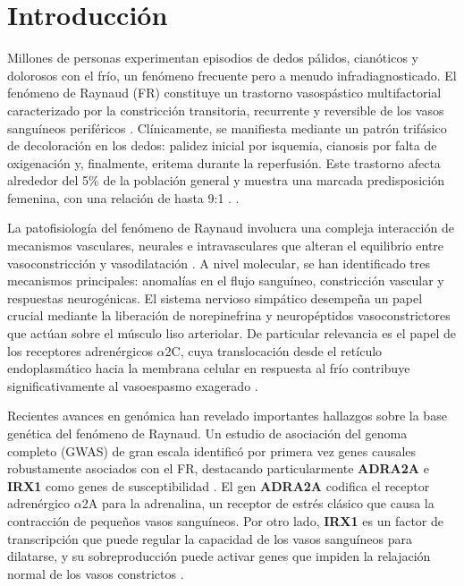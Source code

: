 \section{Introducción}

Millones de personas experimentan episodios de dedos pálidos, cianóticos y dolorosos con el frío, un fenómeno frecuente pero a menudo infradiagnosticado. El fenómeno de Raynaud (FR) constituye un trastorno vasospástico multifactorial caracterizado por la constricción transitoria, recurrente y reversible de los vasos sanguíneos periféricos \cite{Nawaz2022}.  Clínicamente, se manifiesta mediante un patrón trifásico de decoloración en los dedos: palidez inicial por isquemia, cianosis por falta de oxigenación y, finalmente, eritema durante la reperfusión. Este trastorno afecta alrededor del 5\% de la población general y muestra una marcada predisposición femenina, con una relación de hasta 9:1 \cite{Medscape2024, Musa2023}.  
.


La patofisiología del fenómeno de Raynaud involucra una compleja interacción de mecanismos vasculares, neurales e intravasculares que alteran el equilibrio entre vasoconstricción y vasodilatación \cite{Herrick2005}. A nivel molecular, se han identificado tres mecanismos principales: anomalías en el flujo sanguíneo, constricción vascular y respuestas neurogénicas. El sistema nervioso simpático desempeña un papel crucial mediante la liberación de norepinefrina y neuropéptidos vasoconstrictores que actúan sobre el músculo liso arteriolar. De particular relevancia es el papel de los receptores adrenérgicos $\alpha$2C, cuya translocación desde el retículo endoplasmático hacia la membrana celular en respuesta al frío contribuye significativamente al vasoespasmo exagerado \cite{Fardoun2016, Flavahan2008}.

Recientes avances en genómica han revelado importantes hallazgos sobre la base genética del fenómeno de Raynaud. Un estudio de asociación del genoma completo (GWAS) de gran escala identificó por primera vez genes causales robustamente asociados con el FR, destacando particularmente \textbf{ADRA2A} e \textbf{IRX1} como genes de susceptibilidad \cite{Hartmann2023}. El gen \textbf{ADRA2A} codifica el receptor adrenérgico $\alpha$2A para la adrenalina, un receptor de estrés clásico que causa la contracción de pequeños vasos sanguíneos. Por otro lado, \textbf{IRX1} es un factor de transcripción que puede regular la capacidad de los vasos sanguíneos para dilatarse, y su sobreproducción puede activar genes que impiden la relajación normal de los vasos constrictos \cite{ofLondon2023}.

